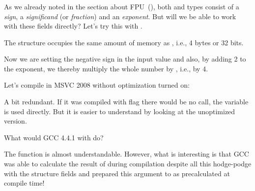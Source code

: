 \subsubsection{\WorkingWithFloatAsWithStructSubSubSectionName}
\label{sec:floatasstruct}

As we already noted in the section about FPU~(), 
both \Tfloat and \Tdouble types consist of a \emph{sign}, 
a \emph{significand} (or \emph{fraction}) and an \emph{exponent}.
But will we be able to work with these fields directly? Let's try this with \Tfloat.





The  structure occupies the same amount of  memory as \Tfloat, i.e., 4 bytes or 32 bits.

Now we are setting the negative sign in the input value and also, by adding 2 to the exponent, 
we thereby multiply the whole number by , i.e., by 4.

Let's compile in MSVC 2008 without optimization turned on:



A bit redundant.
If it was compiled with \Ox flag there would be no  call,
the  variable is used directly.
But it is easier to understand by looking at the unoptimized version.

What would GCC 4.4.1 with \Othree do?



The \ttf function is almost understandable. However, what is interesting is that GCC was able to calculate
the result of  during compilation despite all this hodge-podge with the structure fields
and prepared this argument to \printf{} as precalculated at compile time!
